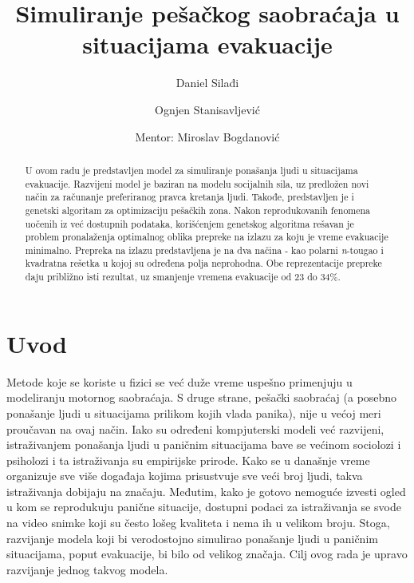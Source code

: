 \documentclass[12pt]{article}
\begin{document}
\title{\textbf{Simuliranje pešačkog saobraćaja u situacijama evakuacije}}

\author{
Daniel Silađi\\
\and
Ognjen Stanisavljević \\
\and
Mentor: Miroslav Bogdanović
}

\date{} %
\maketitle %


\begin{abstract}
U ovom radu je predstavljen model za simuliranje ponašanja ljudi u situacijama evakuacije. Razvijeni model je baziran na modelu socijalnih sila, uz predložen novi način za računanje preferiranog pravca kretanja ljudi. Takođe, predstavljen je i genetski algoritam za optimizaciju pešačkih zona. Nakon reprodukovanih fenomena uočenih iz već dostupnih podataka, korišćenjem genetskog algoritma rešavan je problem pronalaženja optimalnog oblika prepreke na izlazu za koju je vreme evakuacije minimalno. Prepreka na izlazu predstavljena je na dva načina - kao polarni \emph{n}-tougao i kvadratna rešetka u kojoj su određena polja neprohodna. Obe reprezentacije prepreke daju približno isti rezultat, uz smanjenje vremena evakuacije od 23 do 34\%. 
\end{abstract}


\section{Uvod}

Metode koje se koriste u fizici se već duže vreme uspešno primenjuju u  modeliranju motornog saobraćaja. S druge strane, pešački saobraćaj (a posebno ponašanje ljudi u situacijama prilikom kojih vlada panika), nije u većoj meri proučavan na ovaj način. Iako su određeni kompjuterski modeli već razvijeni, istraživanjem ponašanja ljudi u paničnim situacijama bave  se većinom sociolozi i psiholozi i ta istraživanja su empirijske prirode. Kako se u današnje vreme organizuje sve više događaja kojima prisustvuje sve veći broj ljudi, takva istraživanja dobijaju na značaju. Međutim, kako je gotovo nemoguće izvesti ogled u kom se reprodukuju panične situacije, dostupni podaci za istraživanja se svode na video snimke koji su često lošeg kvaliteta i nema ih u velikom broju. Stoga, razvijanje modela koji bi verodostojno simulirao ponašanje ljudi u paničnim situacijama, poput evakuacije, bi bilo od velikog značaja. Cilj ovog rada je upravo razvijanje jednog takvog modela.
\end{document}
